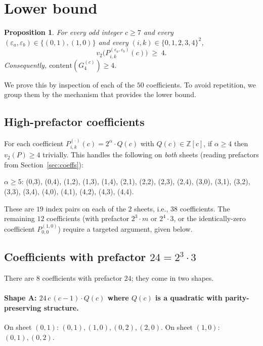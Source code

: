 \documentclass[11pt]{article}
\newtheorem{proposition}[theorem]{Proposition}
\begin{document}
\section{Lower bound}\label{sec:lower}

\begin{proposition}\label{prop:lower}
For every odd integer $c \ge 7$ and every $(\varepsilon_a, \varepsilon_b) \in
\{(0,1),(1,0)\}$ and every $(i,k) \in \{0,1,2,3,4\}^2$,
\[
  v_2\bigl(P^{(\varepsilon_a,\varepsilon_b)}_{i,k}(c)\bigr) \;\ge\; 4.
\]
Consequently, $\mathrm{content}(G_4^{(c)}) \ge 4$.
\end{proposition}

We prove this by inspection of each of the $50$ coefficients. To avoid
repetition, we group them by the mechanism that provides the lower bound.

\subsection{High-prefactor coefficients}\label{ssec:high-prefactor}

For each coefficient $P^{(\cdot)}_{i,k}(c) = 2^\alpha \cdot Q(c)$ with
$Q(c) \in \mathbb{Z}[c]$, if $\alpha \ge 4$ then $v_2(P) \ge 4$ trivially. This
handles the following on \emph{both} sheets (reading prefactors from
Section~\ref{sec:coeffs}):
\begin{center}
$\alpha \ge 5$: (0,3), (0,4), (1,2), (1,3), (1,4), (2,1), (2,2), (2,3), (2,4),$\!$
(3,0), (3,1), (3,2), (3,3), (3,4), (4,0), (4,1), (4,2), (4,3), (4,4).
\end{center}
These are $19$ index pairs on each of the $2$ sheets, i.e., $38$ coefficients.
The remaining $12$ coefficients (with prefactor $2^3 \cdot m$ or $2^4 \cdot 3$,
or the identically-zero coefficient $P^{(1,0)}_{0,0}$) require a targeted
argument, given below.

\subsection{Coefficients with prefactor $24 = 2^3 \cdot 3$}\label{ssec:24}

There are $8$ coefficients with prefactor $24$; they come in two shapes.

\paragraph{Shape A: $24\, c\, (c-1) \cdot Q(c)$ where $Q(c)$ is a quadratic with parity-preserving structure.}
On sheet $(0,1)$: $(0,1), (1,0), (0,2), (2,0)$.
On sheet $(1,0)$: $(0,1), (0,2)$.
\end{document}
